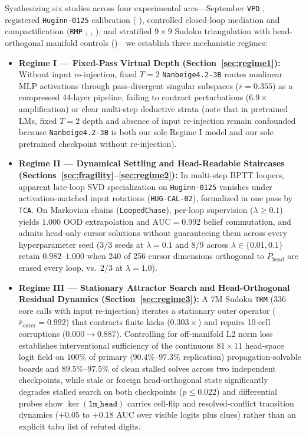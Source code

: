 \documentclass[10pt,letterpaper]{article}
\newcommand{\Phead}{P_{\mathrm{head}}}
\begin{document}
Synthesizing six studies across four experimental arcs—September \texttt{VPD} \cite{dugan2026vpd}, registered \texttt{Huginn-0125} calibration ( \cite{dugan2026hugcal}), controlled closed-loop mediation and compactification (\texttt{RMP} \cite{dugan2026rmp},  \cite{dugan2026loopscope01},  \cite{dugan2026arg02}), and stratified $9\times 9$ Sudoku triangulation with head-orthogonal manifold controls ()—we establish three mechanistic regimes:
\begin{itemize}
  \item \textbf{Regime I — Fixed-Pass Virtual Depth (Section~\ref{sec:regime1}):} Without input re-injection, fixed $T=2$ \texttt{Nanbeige4.2-3B} routes nonlinear MLP activations through pass-divergent singular subspaces ($\bar{r}=0.355$) as a compressed 44-layer pipeline, failing to contract perturbations ($6.9\times$ amplification) or clear multi-step deductive strata (note that in pretrained LMs, fixed $T=2$ depth and absence of input re-injection remain confounded because \texttt{Nanbeige4.2-3B} is both our sole Regime I model and our sole pretrained checkpoint without re-injection).
  \item \textbf{Regime II — Dynamical Settling and Head-Readable Staircases (Sections~\ref{sec:fragility}--\ref{sec:regime2}):} In multi-step BPTT loopers, apparent late-loop SVD specialization on \texttt{Huginn-0125} vanishes under activation-matched input rotations (\texttt{HUG-CAL-02}), formalized in one pass by \texttt{TCA}. On Markovian chains (\texttt{LoopedChase}), per-loop supervision ($\lambda \ge 0.1$) yields $1.000$ OOD extrapolation and $\mathrm{AUC}=0.992$ belief commutation, and admits head-only cursor solutions without guaranteeing them across every hyperparameter seed ($3/3$ seeds at $\lambda=0.1$ and $8/9$ across $\lambda \in \{0.01, 0.1\}$ retain $0.982$--$1.000$ when 240 of 256 cursor dimensions orthogonal to $\Phead$ are erased every loop, vs.\ $2/3$ at $\lambda=1.0$).
  \item \textbf{Regime III — Stationary Attractor Search and Head-Orthogonal Residual Dynamics (Section~\ref{sec:regime3}):} A 7M Sudoku \texttt{TRM} (336 core calls with input re-injection) iterates a stationary outer operator ($\bar{r}_{\mathrm{outer}}=0.992$) that contracts finite kicks ($0.303\times$) and repairs 10-cell corruptions ($0.000 \to 0.887$). Controlling for off-manifold L2 norm loss establishes interventional sufficiency of the continuous $81\times 11$ head-space logit field on $100\%$ of primary ($90.4\%$--$97.3\%$ replication) propagation-solvable boards and $89.5\%$--$97.5\%$ of clean stalled solves across two independent checkpoints, while stale or foreign head-orthogonal state significantly degrades stalled search on both checkpoints ($p \le 0.022$) and differential probes show $\ker(\texttt{lm\_head})$ carries cell-flip and resolved-conflict transition dynamics ($+0.05$ to $+0.18$ AUC over visible logits plus clues) rather than an explicit tabu list of refuted digits.
\end{itemize}
\end{document}

